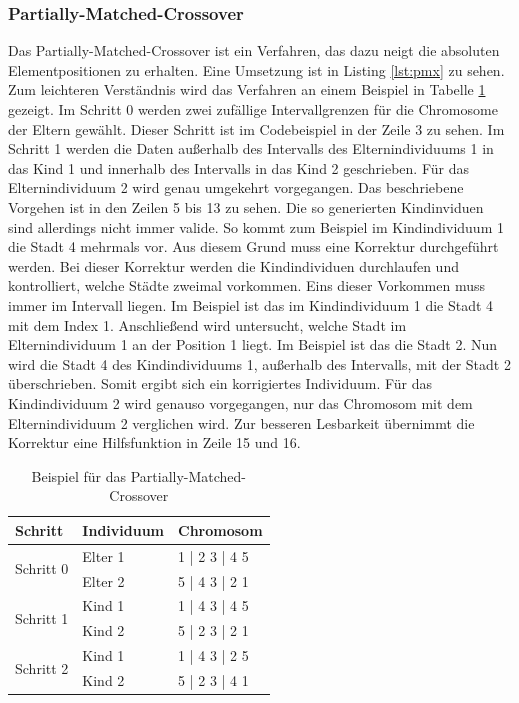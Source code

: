 \subsubsection{Partially-Matched-Crossover}
Das Partially-Matched-Crossover \cite[S. 273]{schoeneburg} ist ein Verfahren, das dazu neigt die absoluten Elementpositionen zu erhalten. Eine Umsetzung ist in Listing \ref{lst:pmx} zu sehen. Zum leichteren Verständnis wird das Verfahren an einem Beispiel in Tabelle \ref{tab:pmx} gezeigt.
Im Schritt 0 werden zwei zufällige Intervallgrenzen für die Chromosome der Eltern gewählt. Dieser Schritt ist im Codebeispiel in der Zeile 3 zu sehen.
Im Schritt 1 werden die Daten außerhalb des Intervalls des Elternindividuums 1 in das Kind 1 und innerhalb des Intervalls in das Kind 2 geschrieben. Für das Elternindividuum 2 wird genau umgekehrt vorgegangen. Das beschriebene Vorgehen ist in den Zeilen 5 bis 13 zu sehen.
Die so generierten Kindinviduen sind allerdings nicht immer valide. So kommt zum Beispiel im Kindindividuum 1 die Stadt 4 mehrmals vor. Aus diesem Grund muss eine Korrektur durchgeführt werden.
Bei dieser Korrektur werden die Kindindividuen durchlaufen und kontrolliert, welche Städte zweimal vorkommen. Eins dieser Vorkommen muss immer im Intervall liegen. Im Beispiel ist das im Kindindividuum 1 die Stadt 4 mit dem Index 1. Anschließend wird untersucht, welche Stadt im Elternindividuum 1 an der Position 1 liegt. Im Beispiel ist das die Stadt 2. Nun wird die Stadt 4 des Kindindividuums 1, außerhalb des Intervalls, mit der Stadt 2 überschrieben. Somit ergibt sich ein korrigiertes Individuum. Für das Kindindividuum 2 wird genauso vorgegangen, nur das Chromosom mit dem Elternindividuum 2 verglichen wird.
Zur besseren Lesbarkeit übernimmt die Korrektur eine Hilfsfunktion in Zeile 15 und 16.
\begin{table}[H]
\centering
\caption{Beispiel für das Partially-Matched-Crossover}
\begin{tabularx}{0.5\textwidth}{l|l|l}
Schritt & Individuum & Chromosom\\
\hline
\multirow{2}{*}{Schritt 0}
		& Elter 1 & 1 | 2 3 | 4 5\\
		&  Elter 2 & 5 | 4 3 | 2 1\\
\hline
\multirow{2}{*}{Schritt 1}
		& Kind 1 &  1 | 4 3 | 4 5\\
		&  Kind 2 & 5 | 2 3 | 2 1\\
\hline
\multirow{2}{*}{Schritt 2}
		& Kind 1 &  1 | 4 3 | 2 5\\
		&  Kind 2 & 5 | 2 3 | 4 1\\
\end{tabularx}
\label{tab:pmx}
\end{table}

